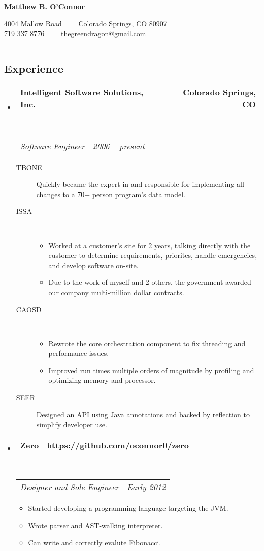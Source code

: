 \documentclass[10pt,letterpaper]{article}
\makeatletter
\newcommand{\headerrow}[2]
{\begin{tabular*}{\linewidth}{l@{\extracolsep{\fill}}r}
	#1 &
	#2 \\
\end{tabular*}}
\makeatother
\begin{document}
\begin{center}
{\LARGE \textbf{Matthew B. O'Connor}}

4004 Mallow Road\ \ \textbullet
\ \ Colorado Springs, CO 80907
\\
719 337 8776\ \ \textbullet
\ \ thegreendragon@gmail.com
\end{center}

\hrule
\vspace{-0.4em}
\subsection*{Experience}

\begin{itemize}
	\parskip=0.1em

	\item
	\headerrow
		{\textbf{Intelligent Software Solutions, Inc.}}
		{\textbf{Colorado Springs, CO}}
	\\
	\headerrow
		{\emph{Software Engineer}}
		{\emph{2006 -- present}}
	\begin{description}
		\item[TBONE] Quickly became the expert in and responsible for implementing all changes to a 70+ person program's data model.
		\item[ISSA] \
			\begin{itemize}
				\item Worked at a customer's site for 2  years, talking directly with the customer to determine requirements, priorites, handle emergencies, and develop software on-site.
				\item Due to the work of myself and 2 others, the government awarded our company multi-million dollar contracts.
			\end{itemize}
		\item[CAOSD] \
			\begin{itemize}
				\item Rewrote the core orchestration component to fix threading and performance issues.
				\item Improved run times multiple orders of magnitude by profiling and optimizing memory and processor.
			\end{itemize}
		\item[SEER] Designed an API using Java annotations and backed by reflection to simplify developer use.
	\end{description}

	\item
	\headerrow
		{\textbf{Zero}}
		{\textbf{https://github.com/oconnor0/zero}}
	\\
	\headerrow
		{\emph{Designer and Sole Engineer}}
		{\emph{Early 2012}}
	\begin{itemize}
		\item Started developing a programming language targeting the JVM.
		\item Wrote parser and AST-walking interpreter.
		\item Can write and correctly evalute Fibonacci.
	\end{itemize}


\end{itemize}
\end{document}
